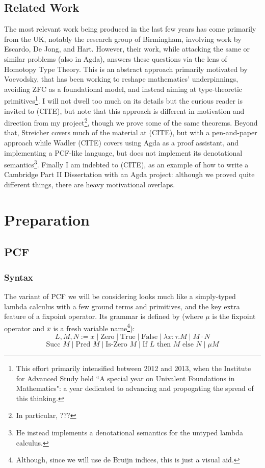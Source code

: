 \documentclass[12pt,a4paper,twoside,openright]{report}
\begin{document}
\section{Related Work}
The most relevant work being produced in the last few years has come primarily from the UK, notably the research group of Birmingham, involving work by Escardo, De Jong, and Hart. However, their work, while attacking the same or similar problems (also in Agda), answers these questions via the lens of Homotopy Type Theory. This is an abstract approach primarily motivated by Voevodsky, that has been working to reshape mathematics' underpinnings, avoiding ZFC as a foundational model, and instead aiming at type-theoretic primitives\footnote{This effort primarily intensified between 2012 and 2013, when the Institute for Advanced Study held ``A special year on Univalent Foundations in Mathematics": a year dedicated to advancing and propogating the spread of this thinking.}. I will not dwell too much on its details but the curious reader is invited to (CITE), but note that this approach is different in motivation and direction from my project\footnote{In particular, ???}, though we prove some of the same theorems.
Beyond that, Streicher covers much of the material at (CITE), but with a pen-and-paper approach while Wadler (CITE) covers using Agda as a proof assistant, and implementing a PCF-like language, but does not implement its denotational semantics\footnote{He instead implements a denotational semantics for the untyped lambda calculus.}. Finally I am indebted to (CITE), as an example of how to write a Cambridge Part II Dissertation with an Agda project: although we proved quite different things, there are heavy motivational overlaps. 
\chapter{Preparation}
\section{PCF}
\subsection{Syntax}
The variant of PCF we will be considering looks much like a simply-typed lambda calculus with a few ground terms and primitives, and the key extra feature of a fixpoint operator. Its grammar is defined by (where $\mu$ is the fixpoint operator and $x$ is a fresh variable name\footnote{Although, since we will use de Bruijn indices, this is just a visual aid.}):
\[
L, M, N := x \mid \text{Zero} \mid \text{True} \mid \text{False} \mid \lambda x: \tau . M \mid M \cdot N 
\]
\[
\text{Succ }M \mid \text{Pred }M \mid \text{Is-Zero }M \mid \text{If }L \text{ then }M \text{ else }N \mid \mu M
\]
\end{document}
